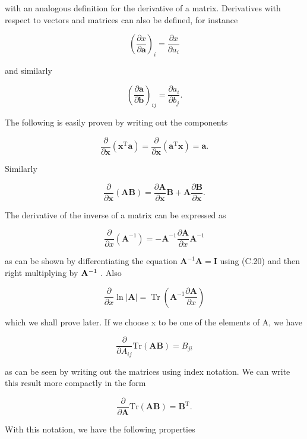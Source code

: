 \documentclass[
  10
]{article}
\begin{document}
with an analogous definition for the derivative of a matrix. Derivatives
with respect to vectors and matrices can also be defined, for instance

\[
\left(\frac {\partial x}{\partial \mathbf {a}}\right) _ {i} = \frac {\partial x}{\partial a _ {i}}\tag{C.17}
\]

and similarly

\[
\left(\frac {\partial \mathbf {a}}{\partial \mathbf {b}}\right) _ {i j} = \frac {\partial a _ {i}}{\partial b _ {j}}.\tag{C.18}
\]

The following is easily proven by writing out the components

\[
\frac {\partial}{\partial \mathbf {x}} \left(\mathbf {x} ^ {\mathrm{T}} \mathbf {a}\right) = \frac {\partial}{\partial \mathbf {x}} \left(\mathbf {a} ^ {\mathrm{T}} \mathbf {x}\right) = \mathbf {a}.\tag{C.19}
\]

Similarly

\[
\frac {\partial}{\partial \mathbf {x}} (\mathbf {A B}) = \frac {\partial \mathbf {A}}{\partial \mathbf {x}} \mathbf {B} + \mathbf {A} \frac {\partial \mathbf {B}}{\partial \mathbf {x}}.\tag{C.20}
\]

The derivative of the inverse of a matrix can be expressed as

\[
\frac {\partial}{\partial x} \left(\mathbf {A} ^ {- 1}\right) = - \mathbf {A} ^ {- 1} \frac {\partial \mathbf {A}}{\partial x} \mathbf {A} ^ {- 1}\tag{C.21}
\]

as can be shown by differentiating the equation
\(\mathbf { A } ^ { - 1 } \mathbf { A } = \mathbf { I }\) using (C.20)
and then right multiplying by \({ { \bf A } ^ { - 1 } }\) . Also

\[
\frac {\partial}{\partial x} \ln | \mathbf {A} | = \operatorname{Tr} \left(\mathbf {A} ^ {- 1} \frac {\partial \mathbf {A}}{\partial x}\right)\tag{C.22}
\]

which we shall prove later. If we choose x to be one of the elements of
A, we have

\[
\frac {\partial}{\partial A _ {i j}} \mathrm{Tr} (\mathbf {A B}) = B _ {j i}\tag{C.23}
\]

as can be seen by writing out the matrices using index notation. We can
write this result more compactly in the form

\[
\frac {\partial}{\partial \mathbf {A}} \mathrm{Tr} (\mathbf {A B}) = \mathbf {B} ^ {\mathrm{T}}.\tag{C.24}
\]

With this notation, we have the following properties
\end{document}
